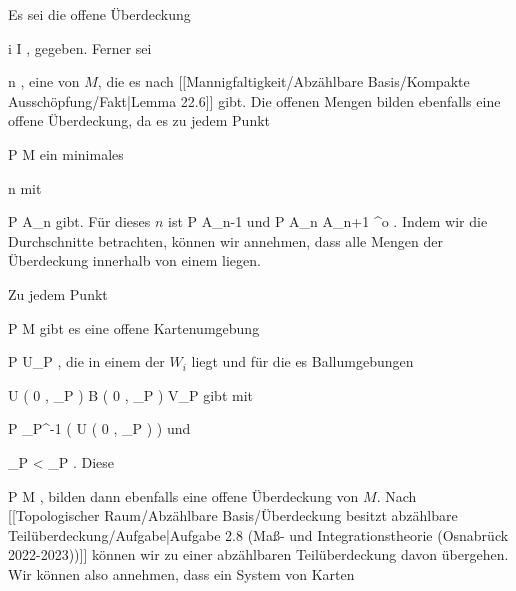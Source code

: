 {

\teilbeweis {}{}{}
{Es sei die offene Überdeckung

 {}
 {i \in I} {}
 {} {} {} {,}
gegeben. Ferner sei

 {}
 {n \in \N} {}
 {} {} {} {,}
eine
von $M$, die es nach
[[Mannigfaltigkeit/Abzählbare Basis/Kompakte Ausschöpfung/Fakt|Lemma 22.6]]
gibt. Die offenen Mengen
 bilden ebenfalls eine offene Überdeckung, da es zu jedem Punkt

\mavergleichskette
{\vergleichskette
{ P
}
{ \in }{ M
}
{  }{
}
{    }{
}
{   }{
}
}
{}{}{}
ein minimales

\mavergleichskette
{\vergleichskette
{ n
}
{ \in }{ \N
}
{  }{
}
{    }{
}
{   }{
}
}
{}{}{}
mit

\mavergleichskette
{\vergleichskette
{ P
}
{ \in }{ A_n
}
{  }{
}
{    }{
}
{   }{
}
}
{}{}{}
 {} {}
gibt. Für dieses $n$ ist
\mathkor {} {P \not\in A_{n-1}} {und} {P \in A_n \subseteq A_{n+1} ^{o}} {.}
Indem wir die Durchschnitte
 betrachten, können wir annehmen, dass alle Mengen der Überdeckung innerhalb von einem
 liegen.}
{}
\teilbeweis {}{}{}
{Zu jedem Punkt

\mavergleichskette
{\vergleichskette
{ P
}
{ \in }{ M
}
{  }{
}
{    }{
}
{   }{
}
}
{}{}{}
gibt es eine offene
 {} {}
Kartenumgebung

\mavergleichskette
{\vergleichskette
{ P
}
{ \in }{ U_P
}
{  }{
}
{    }{
}
{   }{
}
}
{}{}{,}
die in einem der $W_i$ liegt und für die es Ballumgebungen

\mavergleichskettedisp
{\vergleichskette
{ U \left(   0 , \delta_P   \right)
}
{ \subset} { B  \left(  0 , \epsilon_P  \right)
}
{ \subset} { V_P
}
{ } {
}
{ } {
}
}
{}{}{}
gibt mit

\mavergleichskette
{\vergleichskette
{ P
}
{ \in }{ \alpha_P^{-1} \left(  U \left(   0 , \delta_P   \right)  \right)
}
{  }{
}
{    }{
}
{   }{
}
}
{}{}{}
und

\mavergleichskette
{\vergleichskette
{ \delta_P
}
{ < }{ \epsilon_P
}
{  }{
}
{    }{
}
{   }{
}
}
{}{}{.}
Diese

 {}
 {P \in M} {}
 {} {} {} {,}
bilden dann ebenfalls eine offene Überdeckung von $M$. Nach
[[Topologischer Raum/Abzählbare Basis/Überdeckung besitzt abzählbare Teilüberdeckung/Aufgabe|Aufgabe 2.8 (Maß- und Integrationstheorie (Osnabrück 2022-2023))]]
können wir zu einer abzählbaren Teilüberdeckung davon übergehen. Wir können also annehmen, dass ein System von Karten

}}
